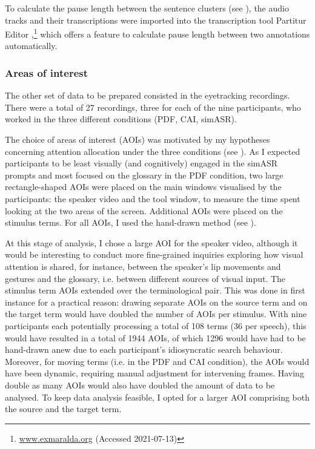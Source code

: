 To calculate the pause length between the sentence clusters (see ), the audio tracks and their transcriptions were imported into the transcription tool Partitur Editor \citep{Schmidtworner2014},\footnote{\url{www.exmaralda.org} (Accessed 2021-07-13)} which offers a feature to calculate pause length between two annotations automatically.


\subsubsection{Areas of interest} \label{AOI}
The other set of data to be prepared consisted in the eyetracking recordings. There were a total of 27 recordings, three for each of the nine participants, who worked in the three different conditions (PDF, CAI, simASR).

The choice of areas of interest (AOIs) was motivated by my hypotheses concerning attention allocation under the three conditions (see ). As I expected participants to be least visually (and cognitively) engaged in the simASR prompts and most focused on the glossary in the PDF condition, two large rectangle-shaped AOIs were placed on the main windows visualised by the participants: the speaker video and the tool window, to measure the time spent looking at the two areas of the screen. Additional AOIs were placed on the stimulus terms. For all AOIs, I used the hand-drawn method (see \citealt[1695]{hessels_area--interest_2016}).

At this stage of analysis, I chose a large AOI for the speaker video, although it would be interesting to conduct more fine-grained inquiries exploring how visual attention is shared, for instance, between the speaker's lip movements \citep{gieshoff_impact_2018,seubert_visuelle_2019} and gestures \citep{seeber_multimodal_2012} and the glossary, i.e. between different sources of visual input. The stimulus term AOIs extended over the terminological pair. This was done in first instance for a practical reason: drawing separate AOIs on the source term and on the target term would have doubled the number of AOIs per stimulus. With nine participants each potentially processing a total of 108 terms (36 per speech), this would have resulted in a total of 1944 AOIs, of which 1296 would have had to be hand-drawn anew due to each participant's idiosyncratic search behaviour. Moreover, for moving terms (i.e. in the PDF and CAI condition), the AOIs would have been dynamic, requiring manual adjustment for intervening frames. Having double as many AOIs would also have doubled the amount of data to be analysed. To keep data analysis feasible, I opted for a larger AOI comprising both the source and the target term.



